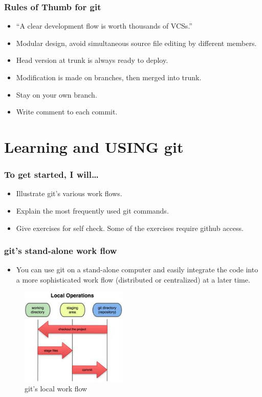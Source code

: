 \documentclass[11pt,ignorenonframetext,]{beamer}
\begin{document}
\begin{frame}\frametitle{Rules of Thumb for git}

\begin{itemize}
\item
  ``A clear development flow is worth thousands of VCSs.''
\item
  Modular design, avoid simultaneous source file editing by different
  members.
\item
  Head version at trunk is always ready to deploy.
\item
  Modification is made on branches, then merged into trunk.
\item
  Stay on your own branch.
\item
  Write comment to each commit.
\end{itemize}
\end{frame}

\section{Learning and USING git}

\begin{frame}\frametitle{To get started, I will\ldots{}}

\begin{itemize}
\item
  Illustrate git's various work flows.
\item
  Explain the most frequently used git commands.
\item
  Give exercises for self check. Some of the exercises require github
  access.
\end{itemize}
\end{frame}

\begin{frame}\frametitle{git's stand-alone work flow}

\begin{itemize}
\item
  You can use git on a stand-alone computer and easily integrate the
  code into a more sophisticated work flow (distributed or centralized)
  at a later time.
\end{itemize}
\begin{figure}[htbp]
\centering
\includegraphics[width=0.45\textwidth]{figures/gitstandalone.jpeg}
\caption{git's local work flow}
\end{figure}

\end{frame}
\end{document}
